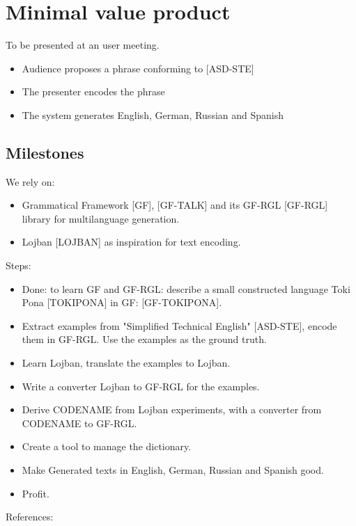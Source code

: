 \documentclass{article}
\begin{document}
\section{Minimal value product}

To be presented at an user meeting.

\begin{itemize}
\item Audience proposes a phrase conforming to [ASD-STE]
\item The presenter encodes the phrase
\item The system generates English, German, Russian and Spanish
\end{itemize}

\subsection{Milestones}\label{milestones}

We rely on:

\begin{itemize}
\item Grammatical Framework [GF], [GF-TALK] and its GF-RGL [GF-RGL] library for multilanguage generation.
\item Lojban [LOJBAN] as inspiration for text encoding.
\end{itemize}

Steps:

\begin{itemize}
\item Done: to learn GF and GF-RGL: describe a small constructed language Toki Pona [TOKIPONA] in GF: [GF-TOKIPONA].
\item Extract examples from "Simplified Technical English" [ASD-STE], encode them in GF-RGL. Use the examples as the ground truth.
\item Learn Lojban, translate the examples to Lojban.
\item Write a converter Lojban to GF-RGL for the examples.
\item Derive CODENAME from Lojban experiments, with a converter from CODENAME to GF-RGL.
\item Create a tool to manage the dictionary.
\item Make Generated texts in English, German, Russian and Spanish good.
\item Profit.
\end{itemize}

References:
\end{document}
